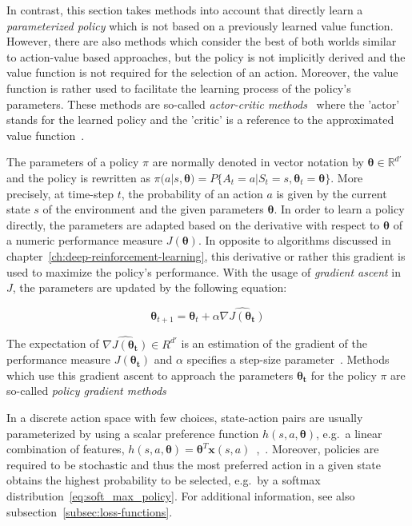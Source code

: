 \documentclass[draft,final]{vutinfth} %
\newcommand{\p}[1]{see p. #1}
\begin{document}
    In contrast, this section takes methods into account that directly learn a \textit{parameterized policy} which is not based on a previously learned value function.
    However, there are also methods which consider the best of both worlds similar to action-value based approaches, but the policy is not implicitly derived and the value function is not required for the selection of an action.
    Moreover, the value function is rather used to facilitate the learning process of the policy's parameters.
    These methods are so-called \textit{actor-critic methods}~ where the 'actor' stands for the learned policy and the 'critic' is a reference to the approximated value function~\citep[\p{321}]{sutton_reinforcement_2018}.

    The parameters of a policy $\pi$ are normally denoted in vector notation by $\boldsymbol{\theta} \in \mathbb{R}^{d'}$ and the policy is rewritten as $\pi(a|s,\boldsymbol{\theta})=P\{A_t=a|S_t=s,\boldsymbol{\theta}_t=\boldsymbol{\theta}\}$.
    More precisely, at time-step $t$, the probability of an action $a$ is given by the current state $s$ of the environment and the given parameters $\boldsymbol{\theta}$.
    In order to learn a policy directly, the parameters are adapted based on the derivative with respect to $\boldsymbol{\theta}$ of a numeric performance measure $J(\boldsymbol{\theta})$.
    In opposite to algorithms discussed in chapter~\ref{ch:deep-reinforcement-learning}, this derivative or rather this gradient is used to maximize the policy's performance.
    With the usage of \textit{gradient ascent} in $J$, the parameters are updated by the following equation:

    \begin{equation}
        \boldsymbol{\theta}_{t+1}=\boldsymbol{\theta}_{t} + \alpha \widehat{\nabla J(\boldsymbol{\theta_t})}\label{eq:parameter_update}
    \end{equation}

    The expectation of $\widehat{\nabla J(\boldsymbol{\theta_t})} \in R^{d'}$ is an estimation of the gradient of the performance measure $J(\boldsymbol{\theta_t})$ and $\alpha$ specifies a step-size parameter~.
    Methods which use this gradient ascent to approach the parameters $\boldsymbol{\theta_t}$ for the policy $\pi$ are so-called \textit{policy gradient methods}

    In a discrete action space with few choices, state-action pairs are usually parameterized by using a scalar preference function $h(s,a,\boldsymbol{\theta})$, e.g.\ a linear combination of features, $h(s,a,\boldsymbol{\theta})=\boldsymbol{\theta}^T\boldsymbol{x}(s,a)$~\citep[\p{321}]{sutton_reinforcement_2018},~.
    Moreover, policies are required to be stochastic and thus the most preferred action in a given state obtains the highest probability to be selected, e.g.\ by a softmax distribution~\eqref{eq:soft_max_policy}.
    For additional information, see also subsection~\ref{subsec:loss-functions}.
\end{document}
